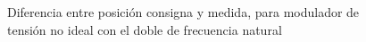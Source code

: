 \documentclass[a4paper, 10pt, onecolumn,journal]{ieeeconf}
\begin{document}
\begin{figure}[H]
	\centering
	\begin{adjustbox}{max width=\columnwidth}
	\end{adjustbox}
	\caption{Diferencia entre posición consigna y medida, para modulador de tensión no ideal con el doble de frecuencia natural}
	\label{Diferencia entre posición consigna y medida, para modulador de tensión no ideal con el doble de frecuencia natural}
\end{figure}
\end{document}
